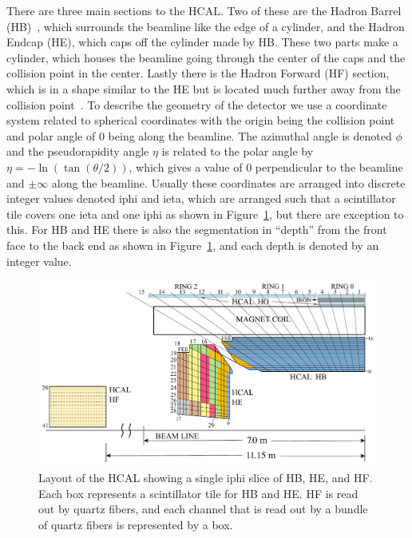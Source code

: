 There are three main sections to the HCAL. Two of these are the Hadron Barrel (HB)~\cite{HB}, which surrounds the beamline like the edge of a cylinder, and the Hadron Endcap (HE), which caps off the cylinder made by HB. These two parts make a cylinder, which houses the beamline going through the center of the caps and the collision point in the center. Lastly there is the Hadron Forward (HF) section, which is in a shape similar to the HE but is located much further away from the collision point~\cite{HF}. To describe the geometry of the detector we use a coordinate system related to spherical coordinates with the origin being the collision point and polar angle of 0 being along the beamline. The azimuthal angle is denoted $\phi$ and the pseudorapidity angle $\eta$ is related to the polar angle by $\eta = -\ln(\tan(\theta/2))$, which gives a value of 0 perpendicular to the beamline and $\pm\infty$ along the beamline. Usually these coordinates are arranged into discrete integer values denoted iphi and ieta, which are arranged such that a scintillator tile covers one ieta and one iphi as shown in Figure~\ref{fig:Depth}, but there are exception to this. For HB and HE there is also the segmentation in ``depth'' from the front face to the back end as shown in Figure~\ref{fig:Depth}, and each depth is denoted by an integer value. 


\begin{figure}
\centering
\includegraphics[width=\linewidth]{Figures/Depthsegmentation.pdf}
\caption{Layout of the HCAL showing a single iphi slice of HB, HE, and HF. Each box represents a scintillator tile for HB and HE. HF is read out by quartz fibers, and each channel that is read out by a bundle of quartz fibers is represented by a box.}
\label{fig:Depth}
\end{figure}

